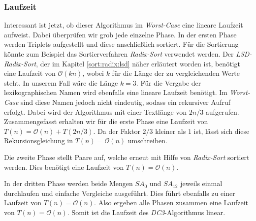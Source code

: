 \subsubsection{Laufzeit}
\label{dc3:algorithmus:laufzeit}

Interessant ist jetzt, ob dieser Algorithmus im \emph{Worst-Case} eine lineare Laufzeit aufweist. Dabei überprüfen wir grob jede einzelne Phase.
In der ersten Phase werden Triplets aufgestellt und diese anschließlich sortiert. Für die Sortierung könnte zum Beispiel das Sortierverfahren \emph{Radix-Sort} verwendet werden. Der \emph{LSD-Radix-Sort}, der im Kapitel \ref{sort:radix:lsd} näher erläutert worden ist, benötigt eine Laufzeit von $\mathcal{O}(kn)$, wobei $k$ für die Länge der zu ver\-gleich\-en\-den Werte steht. In unserem Fall wäre die Länge $k = 3$. Für die Vergabe der lexikographischen Namen wird ebenfalls eine lineare Laufzeit benötigt. Im \emph{Worst-Case} sind diese Namen jedoch nicht eindeutig, sodass ein rekursiver Aufruf erfolgt. Dabei wird der Algorithmus mit einer Textlänge von $2n/3$ aufgerufen. Zusammengefasst erhalten wir für die erste Phase eine Laufzeit von $T(n) = \mathcal{O}(n) + T(2n/3)$. Da der Faktor $2/3$ kleiner als $1$ ist, lässt sich diese Rekursionsgleichung in $T(n) = \mathcal{O}(n)$ umschreiben.

Die zweite Phase stellt Paare auf, welche erneut mit Hilfe von \emph{Radix-Sort} sortiert werden. Dies benötigt eine Laufzeit von $T(n) = \mathcal{O}(n)$.

In der dritten Phase werden beide Mengen $SA_{0}$ und $SA_{12}$ jeweils einmal durchlaufen und einfache Vergleiche ausgeführt. Dies führt ebenfalls zu einer Laufzeit von $T(n) = \mathcal{O}(n)$.
Also ergeben alle Phasen zusammen eine Laufzeit von $T(n) = \mathcal{O}(n)$. Somit ist die Laufzeit des \emph{DC3}-Algorithmus linear.